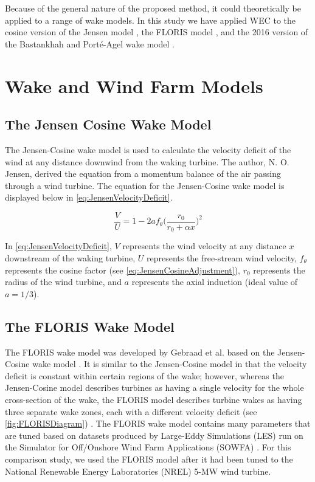 \documentclass[a4paper]{jpconf}
\begin{document}
Because of the general nature of the proposed method, it could theoretically be applied to a range of wake models. In this study we have applied WEC to the cosine version of the Jensen model \cite{jensen1983}, the FLORIS model \cite{gebraad2014,thomas2017-Improving-FLORIS}, and the 2016 version of the Bastankhah and Port\'e-Agel wake model \cite{bastankhah2016}.

\section{Wake and Wind Farm Models}
\subsection{The Jensen Cosine Wake Model}
The Jensen-Cosine wake model is used to calculate the velocity deficit of the wind at any distance downwind from the waking turbine. The author, N. O. Jensen, derived the equation from a momentum balance of the air passing through a wind turbine. The equation for the Jensen-Cosine wake model is displayed below in \cref{eq:JensenVelocityDeficit}.

\begin{equation}
    \frac{V}{U} = 1 - 2af_\theta \bigg(\frac{r_0}{r_0 + \alpha x} \bigg)^2
    \label{eq:JensenVelocityDeficit}
\end{equation}

In \cref{eq:JensenVelocityDeficit}, $V$ represents the wind velocity at any distance $x$ downstream of the waking turbine, $U$ represents the free-stream wind velocity, $f_\theta$ represents the cosine factor (see \cref{eq:JensenCosineAdjustment}), $r_0$ represents the radius of the wind turbine, and $a$ represents the axial induction (ideal value of $a = 1/3$).

\subsection{The FLORIS Wake Model}
The FLORIS wake model was developed by Gebraad et al. based on the Jensen-Cosine wake model \cite{Gebraad2014}. It is similar to the Jensen-Cosine model in that the velocity deficit is constant within certain regions of the wake; however, whereas the Jensen-Cosine model describes turbines as having a single velocity for the whole cross-section of the wake, the FLORIS model describes turbine wakes as having three separate wake zones, each with a different velocity deficit (see \cref{fig:FLORISDiagram}) \cite{Gebraad2014}. The FLORIS wake model contains many parameters that are tuned based on datasets produced by Large-Eddy Simulations (LES) run on the Simulator for Off/Onshore Wind Farm Applications (SOWFA) \cite{Fleming2015}. For this comparison study, we used the FLORIS model after it had been tuned to the National Renewable Energy Laboratories (NREL) 5-MW wind turbine.
\end{document}
